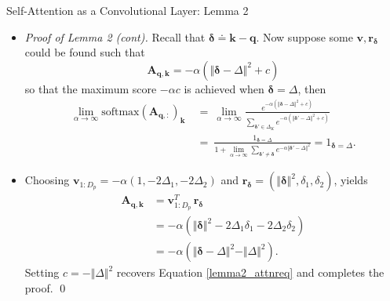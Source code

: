 \documentclass[9pt]{beamer}
\newcommand{\eq}{\ =\ }
\newcommand{\mb}{\bm}
\begin{document}
\newcommand{\sqnorm}[1]{\Vert#1\Vert^2}
\newcommand{\expalpha}[1]{e^{-\alpha#1}}
\newcommand{\limalpha}{\lim_{\alpha\rightarrow\infty}}
\newcommand{\vDelta}{\varDelta}
\begin{frame}{Self-Attention as a Convolutional Layer: Lemma 2}
\begin{itemize}
\item \textit{Proof of Lemma 2 (cont).} Recall that $\bm \delta \doteq \bm k - \bm q$. Now suppose some $\bm v, \bm r_{\bm \delta}$ could be found such that
\begin{equation}
    \mb A_{\mb q, \mb k} = -\alpha(\sqnorm{\bm{\delta - \varDelta}} + c) 
    \label{lemma2_attnreq}
\end{equation}
so that the maximum score $-\alpha c$ is achieved when $\bm\delta = \bm\varDelta$, then
\begin{align*}
    \limalpha \text{softmax}(\mb A_{\mb q, :})_{\mb k} &\eq 
        \limalpha\frac{\expalpha{(\sqnorm{\bm{\delta-\varDelta}}+c)}}{
            \sum_{\bm\delta'\in\Delta_K}
            \expalpha{(\sqnorm{\bm{\delta'-\varDelta}}+c)}
        } \\ &\eq \frac{1_{\bm\delta=\bm\varDelta}}{
            1 + \limalpha\sum_{\bm\delta'\neq \bm\delta}
            \expalpha{\sqnorm{\bm{\delta'-\varDelta}}}
        } = 1_{\bm\delta=\bm\varDelta}.
\end{align*}

\item Choosing $\bm v_{1:D_p} = -\alpha(1, -2\varDelta_1, -2\varDelta_2)$ and $\bm r_{\bm \delta} = (\Vert\bm \delta\Vert^2, \delta_1, \delta_2)$, yields
\begin{align*}
    \mb A_{\mb q, \bm k} &= 
        \mb v_{1:D_p}^T\, \mb r_{\bm \delta}
        \\ &= -\alpha(\sqnorm{\bm\delta} -2\vDelta_1\delta_1-2\vDelta_2\delta_2) 
        \\ &= -\alpha(\sqnorm{\bm\delta-\bm\vDelta} - \sqnorm{\bm\vDelta}).
\end{align*}
Setting $c=-\sqnorm{\bm\varDelta}$ recovers Equation \eqref{lemma2_attnreq} and completes the proof. \qed
\end{itemize}
\end{frame}
\end{document}
